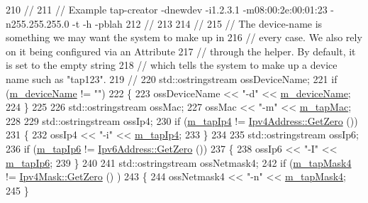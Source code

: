 \begin{DoxyCode}
210       \textcolor{comment}{//}
211       \textcolor{comment}{// Example tap-creator -dnewdev -i1.2.3.1 -m08:00:2e:00:01:23 -n255.255.255.0 -t -h -pblah}
212       \textcolor{comment}{//}
213 
214       \textcolor{comment}{//}
215       \textcolor{comment}{// The device-name is something we may want the system to make up in}
216       \textcolor{comment}{// every case.  We also rely on it being configured via an Attribute}
217       \textcolor{comment}{// through the helper.  By default, it is set to the empty string}
218       \textcolor{comment}{// which tells the system to make up a device name such as "tap123".}
219       \textcolor{comment}{//}
220       std::ostringstream ossDeviceName;
221       \textcolor{keywordflow}{if} (\hyperlink{classns3_1_1EmuFdNetDeviceHelper_a5c259590827f139ae1189a99addeca6a}{m\_deviceName} != \textcolor{stringliteral}{""})
222         \{
223           ossDeviceName << \textcolor{stringliteral}{"-d"} << \hyperlink{classns3_1_1EmuFdNetDeviceHelper_a5c259590827f139ae1189a99addeca6a}{m\_deviceName};
224         \}
225 
226       std::ostringstream ossMac;
227       ossMac << \textcolor{stringliteral}{"-m"} << \hyperlink{classns3_1_1TapFdNetDeviceHelper_a9a9956264595716d15dce3a036621437}{m\_tapMac};
228 
229       std::ostringstream ossIp4;
230       \textcolor{keywordflow}{if} (\hyperlink{classns3_1_1TapFdNetDeviceHelper_a7f090cc7edb3f77def84e7a47614e3f4}{m\_tapIp4} != \hyperlink{classns3_1_1Ipv4Address_aeeb1c76b35d4ab612fda7bc51e99c5db}{Ipv4Address::GetZero} ())
231         \{
232           ossIp4 << \textcolor{stringliteral}{"-i"} << \hyperlink{classns3_1_1TapFdNetDeviceHelper_a7f090cc7edb3f77def84e7a47614e3f4}{m\_tapIp4};
233         \}
234 
235       std::ostringstream ossIp6;
236       \textcolor{keywordflow}{if} (\hyperlink{classns3_1_1TapFdNetDeviceHelper_a6538c02cba836fd1b88779ea48d5d947}{m\_tapIp6} != \hyperlink{classns3_1_1Ipv6Address_a63a34bdb1505e05fbdd07d316d0bd7e6}{Ipv6Address::GetZero} ())
237         \{
238           ossIp6 << \textcolor{stringliteral}{"-I"} << \hyperlink{classns3_1_1TapFdNetDeviceHelper_a6538c02cba836fd1b88779ea48d5d947}{m\_tapIp6};
239         \}
240 
241       std::ostringstream ossNetmask4;
242       \textcolor{keywordflow}{if} (\hyperlink{classns3_1_1TapFdNetDeviceHelper_a74e547cfb30f02bc0987a78c7c2465ee}{m\_tapMask4} != \hyperlink{classns3_1_1Ipv4Mask_ac2dda492011ede8350008d753d278998}{Ipv4Mask::GetZero} () )
243         \{
244           ossNetmask4 << \textcolor{stringliteral}{"-n"} << \hyperlink{classns3_1_1TapFdNetDeviceHelper_a74e547cfb30f02bc0987a78c7c2465ee}{m\_tapMask4};
245         \}

\end{DoxyCode}
